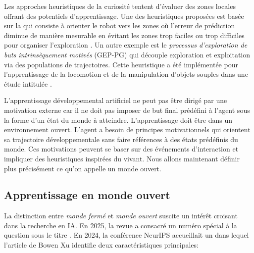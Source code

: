 Les approches heuristiques de la curiosité tentent d'évaluer des zones locales offrant des potentiels d'apprentissage. 
Une des heuristiques proposées est basée sur la  qui consiste à orienter le robot vers les zones où l'erreur de prédiction diminue de manière mesurable en évitant les zones trop faciles ou trop difficiles pour organiser l'exploration \cite{oudeyer_intrinsic_2007}.
Un autre exemple est le \emph{processus d'exploration de buts intrinsèquement motivés} (GEP-PG) qui découple exploration et exploitation via des populations de trajectoires. 
Cette heuristique a été  implémentée pour l'apprentissage de la locomotion et de la manipulation d'objets souples dans une étude intitulée  \cite{forestier_intrinsically_2022}. 


L'apprentissage développemental artificiel ne peut pas être dirigé par une motivation externe car il ne doit pas imposer de but final prédéfini à l'agent sous la forme d'un état du monde à atteindre. 
L'apprentissage doit être  dans un environnement ouvert. 
L'agent a besoin de principes motivationnels qui orientent sa trajectoire développementale sans faire références à des états prédéfinis du monde. 
Ces motivations peuvent se baser sur des événements d'interaction et impliquer des heuristiques inspirées du vivant. 
Nous allons maintenant définir plus précisément ce qu'on appelle  un monde ouvert.

\subsection{Apprentissage en monde ouvert}
\label{sec:monde-ouvert}

\noindent
La distinction entre \emph{monde fermé} et \emph{monde ouvert} suscite un intérêt croisant dans la recherche en IA. 
En 2025, la revue  a consacré un numéro spécial à la question sous le titre  \cite{holder_introduction_2025}.
En 2024, la conférence NeurIPS accueillait un  dans lequel l'article de Bowen Xu  identifie deux caractéristiques principales: 

